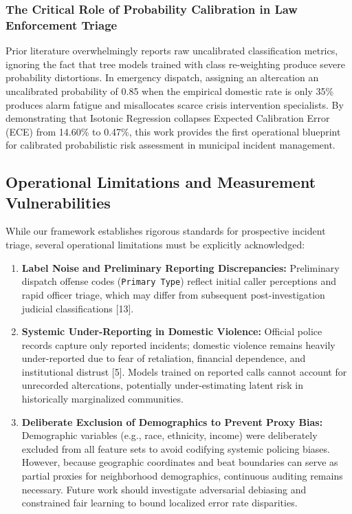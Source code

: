 \documentclass[runningheads]{llncs}
\begin{document}
\subsubsection{The Critical Role of Probability Calibration in Law Enforcement Triage}
Prior literature overwhelmingly reports raw uncalibrated classification metrics, ignoring the fact that tree models trained with class re-weighting produce severe probability distortions. In emergency dispatch, assigning an altercation an uncalibrated probability of 0.85 when the empirical domestic rate is only 35\% produces alarm fatigue and misallocates scarce crisis intervention specialists. By demonstrating that Isotonic Regression collapses Expected Calibration Error (ECE) from 14.60\% to 0.47\%, this work provides the first operational blueprint for calibrated probabilistic risk assessment in municipal incident management.

\subsection{Operational Limitations and Measurement Vulnerabilities}
While our framework establishes rigorous standards for prospective incident triage, several operational limitations must be explicitly acknowledged:
\begin{enumerate}
    \item \textbf{Label Noise and Preliminary Reporting Discrepancies:} Preliminary dispatch offense codes (\texttt{Primary Type}) reflect initial caller perceptions and rapid officer triage, which may differ from subsequent post-investigation judicial classifications [13].
    \item \textbf{Systemic Under-Reporting in Domestic Violence:} Official police records capture only reported incidents; domestic violence remains heavily under-reported due to fear of retaliation, financial dependence, and institutional distrust [5]. Models trained on reported calls cannot account for unrecorded altercations, potentially under-estimating latent risk in historically marginalized communities.
    \item \textbf{Deliberate Exclusion of Demographics to Prevent Proxy Bias:} Demographic variables (e.g., race, ethnicity, income) were deliberately excluded from all feature sets to avoid codifying systemic policing biases. However, because geographic coordinates and beat boundaries can serve as partial proxies for neighborhood demographics, continuous auditing remains necessary. Future work should investigate adversarial debiasing and constrained fair learning to bound localized error rate disparities.
\end{enumerate}
\end{document}
